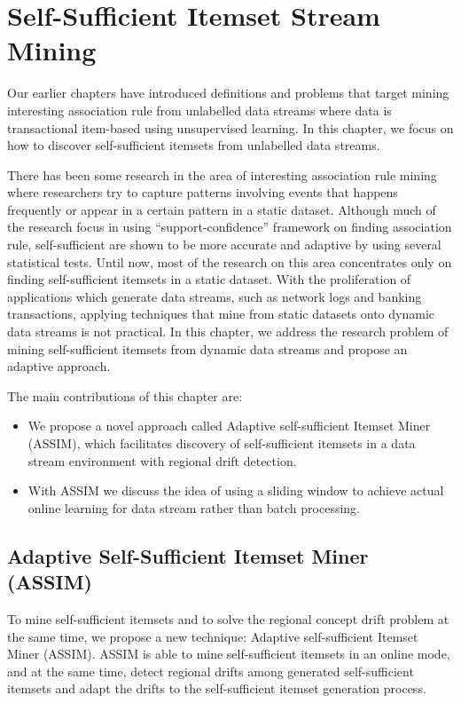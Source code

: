 \chapter{Self-Sufficient Itemset Stream Mining}
\label{chapt:ASSIM}
Our earlier chapters have introduced definitions and problems that target mining interesting association rule from unlabelled data streams where data is transactional item-based using unsupervised learning. In this chapter, we focus on how to discover self-sufficient itemsets from unlabelled data streams.

There has been some research in the area of interesting association rule mining where researchers try to capture patterns involving events that happens frequently or appear in a certain pattern in a static dataset. Although much of the research focus in using ``support-confidence'' framework on finding association rule, self-sufficient are shown to be more accurate and adaptive by using several statistical tests. Until now, most of the research on this area concentrates only on finding self-sufficient itemsets in a static dataset. With the proliferation of applications which generate data streams, such as network logs and banking transactions, applying techniques that mine from static datasets onto dynamic data streams is not practical. In this chapter, we address the research problem of mining self-sufficient itemsets from dynamic data streams and propose an adaptive approach.

The main contributions of this chapter are:
\begin{itemize}
\item We propose a novel approach called  Adaptive self-sufficient Itemset Miner (ASSIM), which facilitates discovery of self-sufficient itemsets in a data stream environment with regional drift detection.
\item With ASSIM we discuss the idea of using a sliding window to achieve actual online learning for data stream rather than batch processing.
\end{itemize}

\section{Adaptive Self-Sufficient Itemset Miner (ASSIM)}
To mine self-sufficient itemsets and to solve the regional concept drift problem at the same time, we propose a new technique: Adaptive self-sufficient Itemset Miner (ASSIM). ASSIM is able to mine self-sufficient itemsets in an online mode, and at the same time, detect regional drifts among generated self-sufficient itemsets and adapt the drifts to the self-sufficient itemset generation process.

